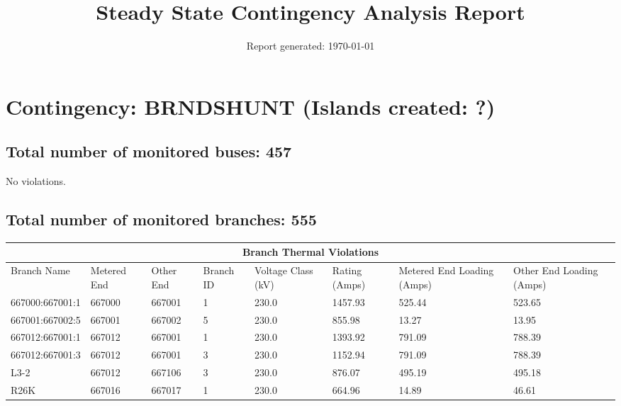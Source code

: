 \documentclass{article}%
\title{Steady State Contingency Analysis Report\vspace{-3ex}}%
\date{Report generated: \today\vspace{-2ex}}%
\begin{document}
%
\normalsize%
\maketitle%
\section*{Contingency: BRNDSHUNT (Islands created: ?)}%
\label{sec:ContingencyBRNDSHUNT(Islandscreated?)}%
\subsection*{Total number of monitored buses: 457}%
\label{subsec:Totalnumberofmonitoredbuses457}%
No violations.

%
\subsection*{Total number of monitored branches: 555}%
\label{subsec:Totalnumberofmonitoredbranches555}%
\begin{tabularx}{\textwidth}{| p{2.51cm} | p{1.5cm} | p{1.5cm} | p{1.5cm} | p{1.5cm} | p{1.5cm} | p{1.5cm} | p{1.5cm} |}%
\hline%
\multicolumn{8}{|c|}{Branch Thermal Violations}\\%
\hline%
Branch Name&Metered End&Other End&Branch ID&Voltage Class (kV)&Rating (Amps)&Metered End Loading (Amps)&Other End Loading (Amps)\\%
\hline%
667000:667001:1&667000&667001&1&230.0&1457.93&525.44&523.65\\%
\hline%
667001:667002:5&667001&667002&5&230.0&855.98&13.27&13.95\\%
\hline%
667012:667001:1&667012&667001&1&230.0&1393.92&791.09&788.39\\%
\hline%
667012:667001:3&667012&667001&3&230.0&1152.94&791.09&788.39\\%
\hline%
L3{-}2&667012&667106&3&230.0&876.07&495.19&495.18\\%
\hline%
R26K&667016&667017&1&230.0&664.96&14.89&46.61\\%
\hline%
\end{tabularx}

%
\end{document}
